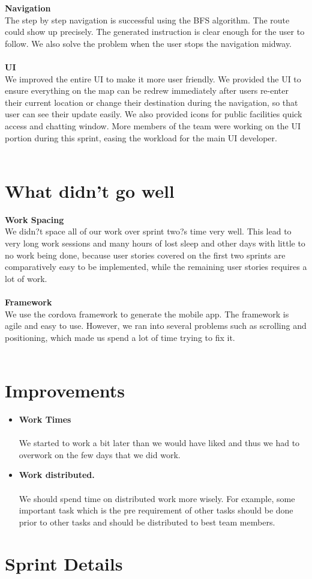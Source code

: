 \documentclass[12pt]{article}
\begin{document}
\textbf{Navigation}\\ The step by step navigation is successful using the BFS algorithm. The route could show up precisely. The generated instruction is clear enough for the user to follow. We also solve the problem when the user stops the navigation midway. \\ \\

\textbf{UI} \\ We improved the entire UI to make it more user friendly.  We provided the UI to ensure everything on the map can be redrew immediately after users re-enter their current location or change their destination during the navigation, so that user can see their update easily. We also provided icons for public facilities quick access and chatting window. More members of the team were working on the UI portion during this sprint, easing the workload for the main UI developer. \\ \\


\section{What didn't go well}

\textbf{Work Spacing}\\
We didn?t space all of our work over sprint two?s time very well. This lead to very long work sessions and many hours of lost sleep and other days with little to no work being done, because user stories covered on the first two sprints are comparatively easy to be implemented, while the remaining user stories requires a lot of work. \\ \\

\textbf{Framework}\\
We use the cordova framework to generate the mobile app. The framework is agile and easy to use. However, we ran into several problems such as scrolling and positioning, which made us spend a lot of time trying to fix it. \\ \\

\section{Improvements}
\begin{itemize}
\item \textbf{Work Times} \\ \\
We started to work a bit later than we would have liked and thus we had to overwork on the few days that we did work. 

\item \textbf{Work distributed.} \\ \\
We should spend time on distributed work more wisely. For example, some important task which is the pre requirement of other tasks should be done prior to other tasks and should be distributed to best team members.

\end{itemize}

\section{Sprint Details}

\end{document}
